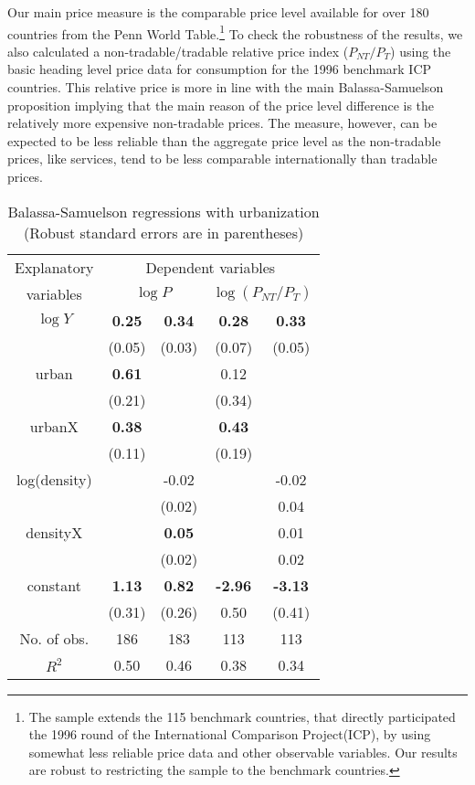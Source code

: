 \documentclass[12pt]{article}
\begin{document}
Our main price measure is the comparable price level available for
over 180 countries from the Penn World Table.\footnote{The sample
extends the 115 benchmark countries, that directly participated the
1996 round of the International Comparison Project(ICP), by using
somewhat less reliable price data and other observable variables.
Our results are robust to restricting the sample to the benchmark
countries.} To check the robustness of the results, we also
calculated a non-tradable/tradable relative price index
($P_{NT}/P_{T}$) using the basic heading level price data for
consumption for the 1996 benchmark ICP countries. This relative
price is more in line with the main Balassa-Samuelson proposition
implying that the main reason of the price level difference is the
relatively more expensive non-tradable prices. The measure, however,
can be expected to be less reliable than the aggregate price level
as the non-tradable prices, like services, tend to be less
comparable internationally than tradable prices.

\begin{table}[h!]
\caption{Balassa-Samuelson regressions with urbanization (Robust
standard errors are in parentheses)} \center \label{tab:BS}
\begin{tabular}{c|cc|cc}
  \hline\hline
  Explanatory & \multicolumn{4}{c}{Dependent variables} \\
  variables &\multicolumn{2}{c}{$\log P$} & \multicolumn{2}{c}{$\log(P_{NT}/P_T)$} \\ \hline
  $\log Y$ & \textbf{0.25} & \textbf{0.34} & \textbf{0.28}   & \textbf{0.33} \\
           & (0.05)        & (0.03)        & (0.07)          & (0.05)        \\
  urban    & \textbf{0.61} &               & 0.12            &               \\
           & (0.21)        &               & (0.34)          &               \\
  urbanX   & \textbf{0.38} &               & \textbf{0.43}   &              \\
           & (0.11)        &               & (0.19)          &              \\
  log(density) &           & -0.02         &                 & -0.02        \\
             &             & (0.02)        &                 &  0.04        \\
  densityX &               & \textbf{0.05} &                  & 0.01         \\
           &               & (0.02)        &                 & 0.02         \\
  constant & \textbf{1.13} & \textbf{0.82} & \textbf{-2.96}  & \textbf{-3.13}\\
           & (0.31)        & (0.26)        & 0.50            & (0.41)        \\ \hline
  No. of obs. & 186        & 183           & 113             & 113          \\
  $R^2$    & 0.50          & 0.46          & 0.38            & 0.34  \\
  \hline\hline
\end{tabular}
\end{table}
\end{document}

